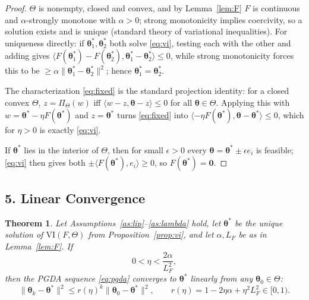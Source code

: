 \documentclass{article}
\newtheorem{theorem}{Theorem}
\theoremstyle{definition}
\theoremstyle{remark}
\begin{document}
\begin{proof}
$\Theta$ is nonempty, closed and convex, and by Lemma~\ref{lem:F} $F$ is continuous and $\alpha$-strongly
monotone with $\alpha > 0$; strong monotonicity implies coercivity, so a solution exists and is unique
(standard theory of variational inequalities). For uniqueness directly: if $\boldsymbol{\theta}_1^*, \boldsymbol{\theta}_2^*$
both solve \eqref{eq:vi}, testing each with the other and adding gives
$\langle F(\boldsymbol{\theta}_1^*) - F(\boldsymbol{\theta}_2^*), \boldsymbol{\theta}_1^* - \boldsymbol{\theta}_2^* \rangle \le 0$,
while strong monotonicity forces this to be $\ge \alpha \|\boldsymbol{\theta}_1^* - \boldsymbol{\theta}_2^*\|^{2}$;
hence $\boldsymbol{\theta}_1^* = \boldsymbol{\theta}_2^*$.

The characterization \eqref{eq:fixed} is the standard projection identity: for a closed convex $\Theta$,
$z = \Pi_\Theta(w)$ iff $\langle w - z, \boldsymbol{\theta} - z\rangle \le 0$ for all $\boldsymbol{\theta} \in \Theta$.
Applying this with $w = \boldsymbol{\theta}^* - \eta F(\boldsymbol{\theta}^*)$ and $z = \boldsymbol{\theta}^*$ turns
\eqref{eq:fixed} into $\langle -\eta F(\boldsymbol{\theta}^*), \boldsymbol{\theta} - \boldsymbol{\theta}^*\rangle \le 0$,
which for $\eta > 0$ is exactly \eqref{eq:vi}.

If $\boldsymbol{\theta}^*$ lies in the interior of $\Theta$, then for small $\epsilon > 0$ every
$\boldsymbol{\theta} = \boldsymbol{\theta}^* \pm \epsilon e_i$ is feasible; \eqref{eq:vi} then gives both
$\pm \langle F(\boldsymbol{\theta}^*), e_i \rangle \ge 0$, so $F(\boldsymbol{\theta}^*) = \mathbf{0}$.
\end{proof}

\subsection*{5. Linear Convergence}

\begin{theorem}\label{thm:main}
Let Assumptions~\ref{as:lip}--\ref{as:lambda} hold, let $\boldsymbol{\theta}^*$ be the unique solution of
$\mathrm{VI}(F,\Theta)$ from Proposition~\ref{prop:vi}, and let $\alpha, L_F$ be as in Lemma~\ref{lem:F}. If
\begin{equation}
0 < \eta < \frac{2\alpha}{L_F^{2}},
\end{equation}
then the PGDA sequence \eqref{eq:pgda} converges to $\boldsymbol{\theta}^*$ linearly from any
$\boldsymbol{\theta}_0 \in \Theta$:
\begin{equation}
\|\boldsymbol{\theta}_k - \boldsymbol{\theta}^*\|^{2}
\le r(\eta)^{k} \|\boldsymbol{\theta}_0 - \boldsymbol{\theta}^*\|^{2},
\qquad
r(\eta) = 1 - 2\eta\alpha + \eta^{2} L_F^{2} \in [0, 1).
\end{equation}
\end{theorem}
\end{document}
